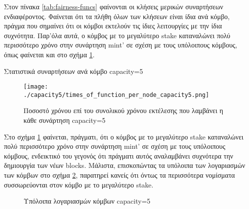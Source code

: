 \documentclass{article}
\newcommand{\eng}[1]{\foreignlanguage{english}{#1}} %
\begin{document}
Στον πίνακα \ref{tab:fairness-funcs} φαίνονται οι κλήσεις μερικών συναρτήσεων
ενδιαφέροντος. Φαίνεται ότι τα πλήθη όλων των κλήσεων είναι ίδια ανά κόμβο,
πράγμα που σημαίνει ότι οι κόμβοι εκτελούν τις ίδιες λειτουργίες με την ίδια
συχνότητα. Παρ'όλα αυτά, ο κόμβος με το μεγαλύτερο \eng{stake} καταναλώνει πολύ
περισσότερο χρόνο στην συνάρτηση \eng{mint'} σε σχέση με τους υπόλοιπους
κόμβους, όπως φαίνεται και στο σχήμα \ref{fig:fairness-funcs}.

\begin{table}[ht]
    \centering
    \caption{Στατιστικά συναρτήσεων ανά κόμβο \eng{capacity=5}}
    \label{tab:fairness-funcs}
\end{table}

\begin{figure}[ht]
    \centering
    \texttt{[image: ./capacity5/times\_of\_function\_per\_node\_capacity5.png]}
    \caption{Ποσοστό χρόνου επί του συνολικού χρόνου εκτέλεσης που λαμβάνει η κάθε συνάρτηση \eng{capacity=5}}
    \label{fig:fairness-funcs}
\end{figure}
\FloatBarrier

Στο σχήμα \ref{fig:fairness-funcs} φαίνεται, πράγματι, ότι ο κόμβος με το
μεγαλύτερο \eng{stake} καταναλώνει πολύ περισσότερο χρόνο στην συνάρτηση
\eng{mint'} σε σχέση με τους υπόλοιπους κόμβους, ενδεικτικό του γεγονός ότι
πράγματι αυτός αναλαμβάνει συχνότερα την δημιουργία των νέων \eng{blocks}.
Μάλιστα, επισκοπώντας τα υπόλοιπα των λογαριασμών των κόμβων στο σχήμα
\ref{fig:fairness-balances}, παρατηρεί κανείς ότι όντως τα περισσότερα
νομίσματα συσσωρεύονται στον κόμβο με το μεγαλύτερο \eng{stake}.

\begin{figure}[h]
    \centering    
    \begin{varwidth}{\linewidth}
        
    \end{varwidth}
    \caption{Υπόλοιπα λογαριασμών κόμβων \eng{capacity=5}}
    \label{fig:fairness-balances}
\end{figure}
\end{document}
